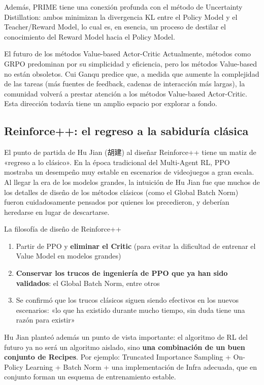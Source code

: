 Además, PRIME tiene una conexión profunda con el método de Uncertainty Distillation: ambos minimizan la divergencia KL entre el Policy Model y el Teacher/Reward Model, lo cual es, en esencia, un proceso de destilar el conocimiento del Reward Model hacia el Policy Model.

\begin{knowledgebox}{El futuro de los métodos Value-based Actor-Critic}
Actualmente, métodos como GRPO predominan por su simplicidad y eficiencia, pero los métodos Value-based no están obsoletos. Cui Ganqu predice que, a medida que aumente la complejidad de las tareas (más fuentes de feedback, cadenas de interacción más largas), la comunidad volverá a prestar atención a los métodos Value-based Actor-Critic. Esta dirección todavía tiene un amplio espacio por explorar a fondo.
\end{knowledgebox}

\subsection{Reinforce++: el regreso a la sabiduría clásica}

El punto de partida de Hu Jian (胡建) al diseñar Reinforce++ tiene un matiz de «regreso a lo clásico». En la época tradicional del Multi-Agent RL, PPO mostraba un desempeño muy estable en escenarios de videojuegos a gran escala. Al llegar la era de los modelos grandes, la intuición de Hu Jian fue que muchos de los detalles de diseño de los métodos clásicos (como el Global Batch Norm) fueron cuidadosamente pensados por quienes los precedieron, y deberían heredarse en lugar de descartarse.

\begin{importantbox}{La filosofía de diseño de Reinforce++}
\begin{enumerate}
    \item Partir de PPO y \textbf{eliminar el Critic} (para evitar la dificultad de entrenar el Value Model en modelos grandes)
    \item \textbf{Conservar los trucos de ingeniería de PPO que ya han sido validados}: el Global Batch Norm, entre otros
    \item Se confirmó que los trucos clásicos siguen siendo efectivos en los nuevos escenarios: «lo que ha existido durante mucho tiempo, sin duda tiene una razón para existir»
\end{enumerate}
\end{importantbox}

Hu Jian planteó además un punto de vista importante: el algoritmo de RL del futuro ya no será un algoritmo aislado, sino \textbf{una combinación de un buen conjunto de Recipes}. Por ejemplo: Truncated Importance Sampling + On-Policy Learning + Batch Norm + una implementación de Infra adecuada, que en conjunto forman un esquema de entrenamiento estable.

